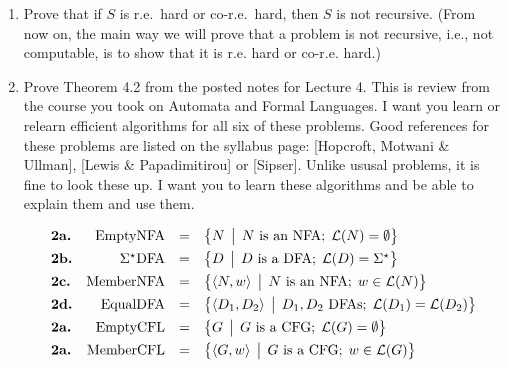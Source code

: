 \documentclass[12pt]{article}
\begin{document}
\thispagestyle{empty}
\noindent{}
\addtocounter{section}{4}

\begin{enumerate}
\item Prove that if $S$ is r.e.\ hard or co-r.e.\ hard, then $S$ is not recursive.  (From now on, the main way we
  will prove that a problem is not recursive, i.e., not computable, is to show that it is r.e. hard
  or co-r.e. hard.)

\item Prove Theorem 4.2 from the posted notes for Lecture 4.  This is review from the course you
  took on Automata and Formal Languages.  I want you learn or relearn efficient algorithms for all
  six of these problems.  Good references for these problems are listed on the syllabus page: 
 [Hopcroft, Motwani \& Ullman], [Lewis \& Papadimitirou] or [Sipser].  Unlike ususal problems, it is
 fine to look these up.  I want you to learn these algorithms and be able to explain them and use them.
      
\[
\begin{array}{lrcl}
\textbf{2a.}&\mbox{{\rm EmptyNFA}} &=& \bigl\{ N \,\bigm|\, N \mbox{ is an NFA};\; {\cal L}(N) = \emptyset \bigr\} \\[1ex]
\textbf{2b.}&\Sigma^\star\mbox{{\rm DFA}} &=& \bigl\{ D \,\bigm|\, D\mbox{ is a DFA};\;
  {\cal L}(D) = \Sigma^\star \bigr\}\\[1ex]
\textbf{2c.}&\mbox{{\rm MemberNFA}} &=& \bigl\{ \langle N,w \rangle \,\bigm|\, N \mbox{ is an NFA};\; w\in {\cal L}(N) \bigr\}\\[1ex]
\textbf{2d.}&\mbox{{\rm EqualDFA}} &=& \bigl\{ \langle D_1,D_2 \rangle \,\bigm|\, D_1,D_2 \mbox{ DFAs};\;{\cal L}(D_1) ={\cal L}(D_2) \bigr\}\\[1ex]
\textbf{2a.}&\mbox{{\rm EmptyCFL}} &=& \bigl\{ G \,\bigm|\, G \mbox{ is a CFG};\; {\cal L}(G) =
  \emptyset \bigr\} \\[1ex] 
\textbf{2a.}&\mbox{{\rm MemberCFL}} &=& \bigl\{ \langle G,w \rangle \,\bigm|\, G \mbox{ is a CFG};\;w\in{\cal L}(G) \bigr\}\\
\end{array}
\]




 
\end{enumerate}
\end{document}
